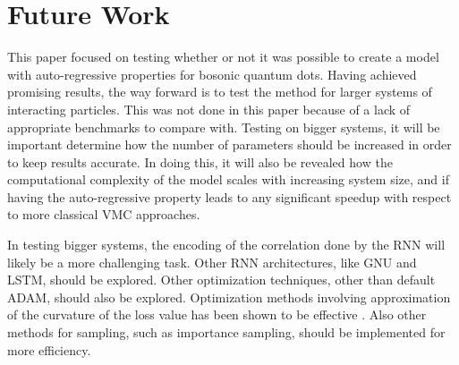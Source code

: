 \section{Future Work}
This paper focused on testing whether or not it was possible to create a model with auto-regressive properties for bosonic quantum dots. Having achieved promising results, the way forward is to test the method for larger systems of interacting particles. This was not done in this paper because of a lack of appropriate benchmarks to compare with. Testing on bigger systems, it will be important determine how the number of parameters should be increased in order to keep results accurate. In doing this, it will also be revealed how the computational complexity of the model scales with increasing system size, and if having the auto-regressive property leads to any significant speedup with respect to more classical VMC approaches.

In testing bigger systems, the encoding of the correlation done by the RNN will likely be a more challenging task. Other RNN architectures, like GNU and LSTM, should be explored. Other optimization techniques, other than default ADAM, should also be explored. Optimization methods involving approximation of the curvature of the loss value has been shown to be effective \cite{pfau2019abinitio}. Also other methods for sampling, such as importance sampling, should be implemented for more efficiency.
